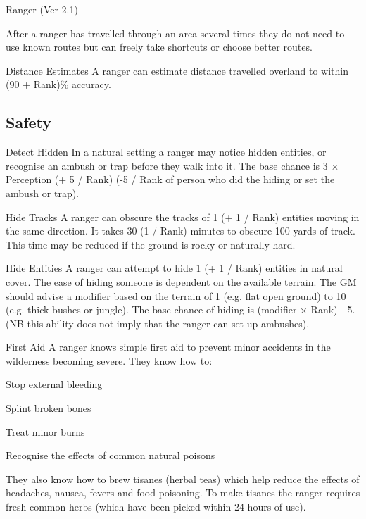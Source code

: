 \begin{Chapter}{Ranger (Ver 2.1)}
\begin{Description}
  After a ranger has travelled through an area several times they do
  not need to use known routes but can freely take shortcuts or choose
  better routes.

\item[Distance Estimates] A ranger can estimate distance travelled
  overland to within (90 + Rank)\% accuracy.

\end{Description}

\subsection{Safety}

\begin{Description}
\item[Detect Hidden] In a natural setting a ranger may notice hidden
  entities, or recognise an ambush or trap before they walk into
  it.  The base chance is 3 × Perception (+ 5 / Rank) (-5 / Rank of
  person who did the hiding or set the ambush or trap).

\item[Hide Tracks] A ranger can obscure the tracks of 1 (+ 1 / Rank)
  entities moving in the same direction.  It takes 30 (1 / Rank)
  minutes to obscure 100 yards of track.  This time may be reduced if
  the ground is rocky or naturally hard.

\item[Hide Entities] A ranger can attempt to hide 1 (+ 1 / Rank)
  entities in natural cover. The ease of hiding someone is dependent
  on the available terrain. The GM should advise a modifier based on
  the terrain of 1 (e.g. flat open ground) to 10 (e.g. thick bushes or
  jungle). The base chance of hiding is (modifier × Rank) - 5. (NB
  this ability does not imply that the ranger can set up ambushes).

\item[First Aid] A ranger knows simple first aid to prevent minor
  accidents in the wilderness becoming severe. They know how to:
\begin{Itemize}
\item Stop external bleeding  
\item Splint broken bones  
\item Treat minor burns  
\item Recognise the effects of common natural poisons 
\end{Itemize}

They also know how to brew tisanes (herbal teas) which help reduce the
effects of headaches, nausea, fevers and food poisoning.  To make
tisanes the ranger requires fresh common herbs (which have been picked
within 24 hours of use).


\end{Description}
\end{Chapter}
